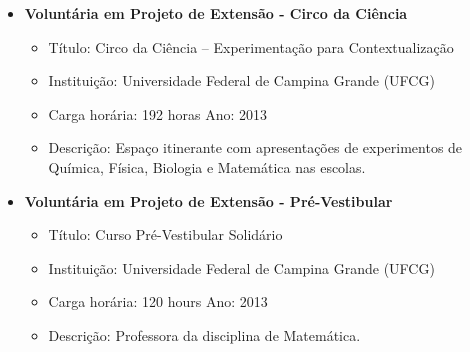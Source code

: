 \documentclass[
  letterpaper,
  DIV=11,
  numbers=noendperiod]{scrartcl}
\providecommand{\tightlist}{%
  \setlength{\itemsep}{0pt}\setlength{\parskip}{0pt}}
\begin{document}
\begin{itemize}
\tightlist
\item
  \textbf{Voluntária em Projeto de Extensão - Circo da Ciência}

  \begin{itemize}
  \tightlist
  \item
    Título: Circo da Ciência -- Experimentação para Contextualização
  \item
    Instituição: Universidade Federal de Campina Grande (UFCG)
  \item
    Carga horária: 192 horas \textbar{} Ano: 2013
  \item
    Descrição: Espaço itinerante com apresentações de experimentos de
    Química, Física, Biologia e Matemática nas escolas.
  \end{itemize}
\item
  \textbf{Voluntária em Projeto de Extensão - Pré-Vestibular}

  \begin{itemize}
  \tightlist
  \item
    Título: Curso Pré-Vestibular Solidário
  \item
    Instituição: Universidade Federal de Campina Grande (UFCG)
  \item
    Carga horária: 120 hours \textbar{} Ano: 2013
  \item
    Descrição: Professora da disciplina de Matemática.
  \end{itemize}
\end{itemize}
\end{document}
